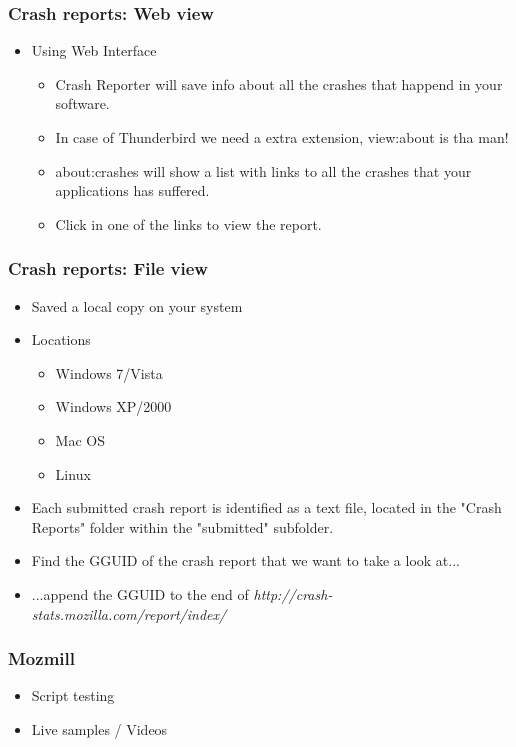 \documentclass{beamer}
\begin{document}
\begin{frame}
\frametitle{Crash reports: Web view}
 \begin{itemize}
  \item Using Web Interface
     \begin{itemize}
       \item Crash Reporter will save info about all the crashes that happend in your software.
       \item In case of Thunderbird we need a extra extension, view:about is tha man!
       \item about:crashes will show a list with links to all the crashes that your applications has suffered.
       \item Click in one of the links to view the report.
     \end{itemize}
 \end{itemize}
\end{frame}


\begin{frame}
\frametitle{Crash reports: File view}
 \begin{itemize}
  \item Saved a local copy on your system
  \item Locations
    \begin{itemize}
      \item Windows 7/Vista
      \item Windows XP/2000
      \item Mac OS
      \item Linux
    \end{itemize}
  \item Each submitted crash report is identified as a text file, located in the "Crash Reports" folder within the "submitted" subfolder.
  \item Find the GGUID of the crash report that we want to take a look at...
  \item ...append the GGUID to the end of \textit{http://crash-stats.mozilla.com/report/index/}
 \end{itemize}
\end{frame}


\begin{frame}
\frametitle{Mozmill}
 \begin{itemize}
  \item Script testing
  \item Live samples / Videos
 \end{itemize}
\end{frame}
\end{document}
